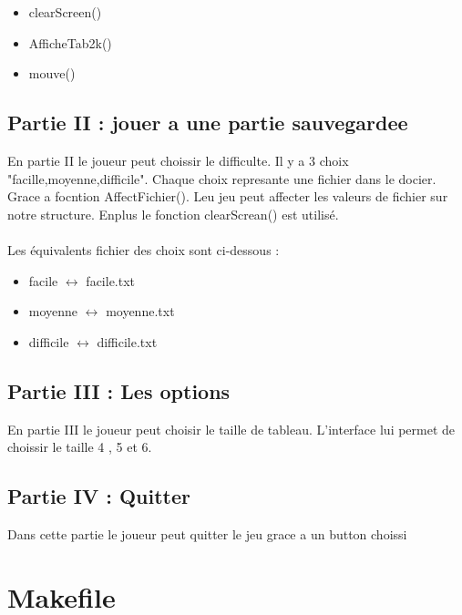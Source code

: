 \documentclass{article}
\begin{document}
\begin{itemize}
	\item clearScreen()
	\item AfficheTab2k()
	\item mouve()
\end{itemize}


\subsection{Partie II : jouer a une partie sauvegardee}
En partie II le joueur peut choissir le difficulte.
Il y a 3 choix "facille,moyenne,difficile".
Chaque choix represante une fichier dans le docier.
Grace a focntion AffectFichier(). Leu jeu peut affecter les valeurs de fichier sur notre structure.
Enplus le fonction clearScrean() est utilisé.
\\ \\
Les équivalents fichier des choix sont ci-dessous : 

\begin{itemize}
	\item facile $\leftrightarrow$ facile.txt
	\item moyenne $\leftrightarrow$ moyenne.txt
	\item difficile $\leftrightarrow$ difficile.txt
\end{itemize}


\subsection{Partie III : Les options}
En partie III le joueur peut choisir le taille de tableau. L'interface lui permet de choissir le taille 4 , 5 et 6.

\subsection{Partie IV : Quitter}
Dans cette partie le joueur peut quitter le jeu grace a un button choissi

\section{Makefile}
\end{document}
